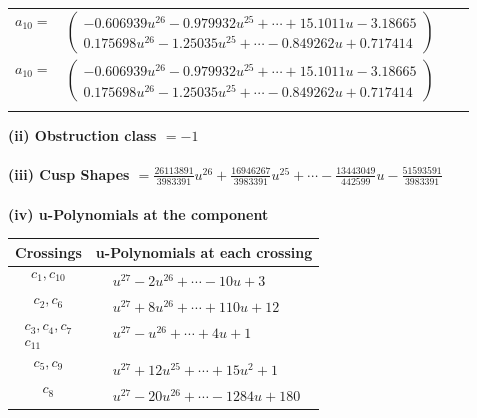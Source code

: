 \documentclass[1p]{elsarticle_modified}
\theoremstyle{definition}
\begin{document}
\begin{tabular}{m{7pt} m{180pt} m{7pt} m{180pt} }
\flushright $a_{10}=$&$\begin{pmatrix}-0.606939 u^{26}-0.979932 u^{25}+\cdots+15.1011 u-3.18665\\0.175698 u^{26}-1.25035 u^{25}+\cdots-0.849262 u+0.717414\end{pmatrix}$\\ \flushright $a_{10}=$&$\begin{pmatrix}-0.606939 u^{26}-0.979932 u^{25}+\cdots+15.1011 u-3.18665\\0.175698 u^{26}-1.25035 u^{25}+\cdots-0.849262 u+0.717414\end{pmatrix}$\\&\end{tabular}
\flushleft \textbf{(ii) Obstruction class $= -1$}\\~\\
\flushleft \textbf{(iii) Cusp Shapes $= \frac{26113891}{3983391} u^{26}+\frac{16946267}{3983391} u^{25}+\cdots-\frac{13443049}{442599} u-\frac{51593591}{3983391}$}\\~\\
\newpage\renewcommand{\arraystretch}{1}
\flushleft \textbf{(iv) u-Polynomials at the component}\newline \\
\begin{tabular}{m{50pt}|m{274pt}}
Crossings & \hspace{64pt}u-Polynomials at each crossing \\
\hline $$\begin{aligned}c_{1},c_{10}\end{aligned}$$&$\begin{aligned}
&u^{27}-2 u^{26}+\cdots-10 u+3
\end{aligned}$\\
\hline $$\begin{aligned}c_{2},c_{6}\end{aligned}$$&$\begin{aligned}
&u^{27}+8 u^{26}+\cdots+110 u+12
\end{aligned}$\\
\hline $$\begin{aligned}c_{3},c_{4},c_{7}\\c_{11}\end{aligned}$$&$\begin{aligned}
&u^{27}- u^{26}+\cdots+4 u+1
\end{aligned}$\\
\hline $$\begin{aligned}c_{5},c_{9}\end{aligned}$$&$\begin{aligned}
&u^{27}+12 u^{25}+\cdots+15 u^2+1
\end{aligned}$\\
\hline $$\begin{aligned}c_{8}\end{aligned}$$&$\begin{aligned}
&u^{27}-20 u^{26}+\cdots-1284 u+180
\end{aligned}$\\
\hline
\end{tabular}\\~\\
\end{document}
